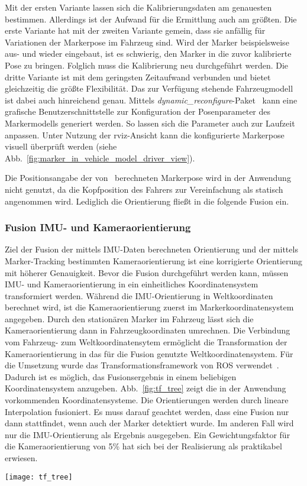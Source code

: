 Mit der ersten Variante lassen sich die Kalibrierungsdaten am genauesten bestimmen.
Allerdings ist der Aufwand für die Ermittlung auch am größten.
Die erste Variante hat mit der zweiten Variante gemein, dass sie anfällig für Variationen der Markerpose im Fahrzeug sind. Wird der Marker beispielsweise aus- und wieder eingebaut, ist es schwierig, den Marker in die zuvor kalibrierte Pose zu bringen.
Folglich muss die Kalibrierung neu durchgeführt werden.
Die dritte Variante ist mit dem geringsten Zeitaufwand verbunden und bietet gleichzeitig die größte Flexibilität.
Das zur Verfügung stehende Fahrzeugmodell ist dabei auch hinreichend genau.
Mittels \emph{dynamic\_reconfigure}-Paket~\cite{ros_dynamic_reconfigure} kann eine grafische Benutzerschnittstelle zur Konfiguration der Posenparameter des Markermodells generiert werden.
So lassen sich die Parameter auch zur Laufzeit anpassen.
Unter Nutzung der rviz-Ansicht kann die konfigurierte Markerpose visuell überprüft werden (siehe Abb.~\ref{fig:marker_in_vehicle_model_driver_view}).

Die Positionsangabe der von \alvar\ berechneten Markerpose wird in der Anwendung nicht genutzt, da die Kopfposition des Fahrers zur Vereinfachung als statisch angenommen wird.
Lediglich die Orientierung fließt in die folgende Fusion ein.

\subsubsection{Fusion IMU- und Kameraorientierung}
\label{headtracking_markerfusion_subsubsec}

Ziel der Fusion der mittels IMU-Daten berechneten Orientierung und der mittels Marker-Tracking bestimmten Kameraorientierung ist eine korrigierte Orientierung mit höherer Genauigkeit.
Bevor die Fusion durchgeführt werden kann, müssen IMU- und Kameraorientierung in ein einheitliches Koordinatensystem transformiert werden.
Während die IMU-Orientierung in Weltkoordinaten berechnet wird, ist die Kameraorientierung zuerst im Markerkoordinatensystem angegeben.
Durch den stationären Marker im Fahrzeug lässt sich die Kameraorientierung dann in Fahrzeugkoordinaten umrechnen.
Die Verbindung vom Fahrzeug- zum Weltkoordinatensytem ermöglicht die Transformation der Kameraorientierung in das für die Fusion genutzte Weltkoordinatensystem.
Für die Umsetzung wurde das Transformationsframework von ROS verwendet~\cite{ros_tf}.
Dadurch ist es möglich, das Fusionsergebnis in einem beliebigen Koordinatensystem anzugeben. Abb.~\ref{fig:tf_tree} zeigt die in der Anwendung vorkommenden Koordinatensysteme.
Die Orientierungen werden durch lineare Interpolation fusioniert.
Es muss darauf geachtet werden, dass eine Fusion nur dann stattfindet, wenn auch der Marker detektiert wurde.
Im anderen Fall wird nur die IMU-Orientierung als Ergebnis ausgegeben.
Ein Gewichtungsfaktor für die Kameraorientierung von 5\% hat sich bei der Realisierung als praktikabel erwiesen.

\begin{figure*}[tb]
 \centering
 \texttt{[image: tf\_tree]}
  \caption{Koordinaten-Frames}
  \label{fig:tf_tree}
\end{figure*}

